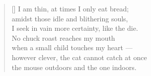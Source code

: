 \documentclass[a4paper,12pt,twoside,final]{book}
\begin{document}
\newpage


\settowidth{\versewidth}{however clever, the cat cannot catch at once}

\begin{verse}[\versewidth]
  I am thin, at times I only eat bread; \\
  amidst those idle and blithering souls, \\
  I seek in vain more certainty, like the die. \\
  No chuck roast reaches my mouth \\
  when a small child touches my heart --- \\
  however clever, the cat cannot catch at once \\
  the mouse outdoors and the one indoors.
\end{verse}

\newpage

\settowidth{\versewidth}{számhoz s szivemhez kisgyerek ---}
\end{document}
